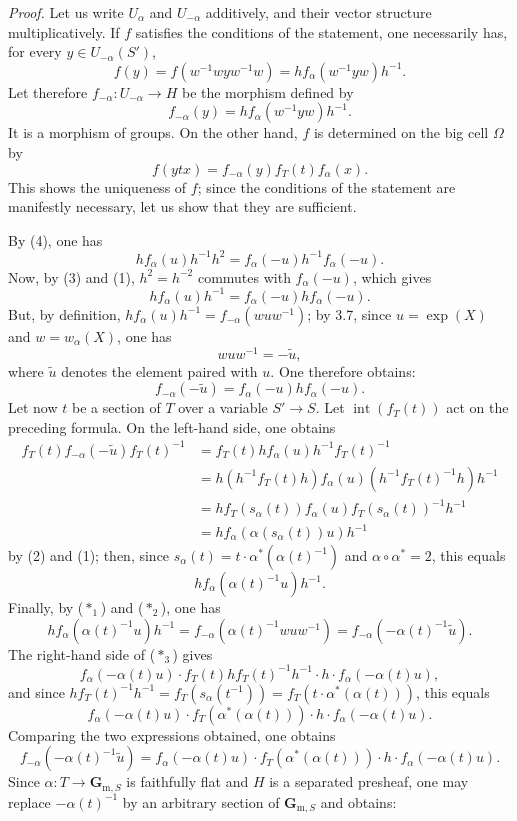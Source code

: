 \emph{Proof.} Let us write $U_\alpha$ and $U_{-\alpha}$ additively, and their vector structure multiplicatively. If $f$ satisfies the conditions of the statement, one necessarily has, for every $y\in U_{-\alpha}(S')$,
\[
f(y)=f(w^{-1}wyw^{-1}w)=hf_\alpha(w^{-1}yw)h^{-1}.
\]
Let therefore $f_{-\alpha}:U_{-\alpha}\to H$ be the morphism defined by
\begin{equation}\tag{$*_1$}\label{XX.6.eq.star1}
f_{-\alpha}(y)=hf_\alpha(w^{-1}yw)h^{-1}.
\end{equation}
It is a morphism of groups. On the other hand, $f$ is determined on the big cell $\Omega$ by
\[
f(ytx)=f_{-\alpha}(y)f_T(t)f_\alpha(x).
\]
This shows the uniqueness of $f$; since the conditions of the statement are manifestly necessary, let us show that they are sufficient.

By (4), one has
\[
hf_\alpha(u)h^{-1}h^2=f_\alpha(-u)h^{-1}f_\alpha(-u).
\]
Now, by (3) and (1), $h^2=h^{-2}$ commutes with $f_\alpha(-u)$, which gives
\[
hf_\alpha(u)h^{-1}=f_\alpha(-u)hf_\alpha(-u).
\]
But, by definition, $hf_\alpha(u)h^{-1}=f_{-\alpha}(wuw^{-1})$; by 3.7, since $u=\exp(X)$ and $w=w_\alpha(X)$, one has
\begin{equation}\tag{$*_2$}\label{XX.6.eq.star2}
wuw^{-1}=-\widetilde u,
\end{equation}
where $\widetilde u$ denotes the element paired with $u$. One therefore obtains:
\begin{equation}\tag{$*_3$}\label{XX.6.eq.star3}
f_{-\alpha}(-\widetilde u)=f_\alpha(-u)hf_\alpha(-u).
\end{equation}
Let now $t$ be a section of $T$ over a variable $S'\to S$. Let $\operatorname{int}(f_T(t))$ act on the preceding formula. On the left-hand side, one obtains{\renewcommand{\thefootnote}{(37)}}
\[
\begin{aligned}
f_T(t)f_{-\alpha}(-\widetilde u)f_T(t)^{-1}&=f_T(t)hf_\alpha(u)h^{-1}f_T(t)^{-1}\\
&=h(h^{-1}f_T(t)h)f_\alpha(u)(h^{-1}f_T(t)^{-1}h)h^{-1}\\
&=hf_T(s_\alpha(t))f_\alpha(u)f_T(s_\alpha(t))^{-1}h^{-1}\\
&=hf_\alpha(\alpha(s_\alpha(t))u)h^{-1}
\end{aligned}
\]
by (2) and (1); then, since $s_\alpha(t)=t\cdot\alpha^*(\alpha(t)^{-1})$ and $\alpha\circ\alpha^*=2$, this equals
\[
hf_\alpha(\alpha(t)^{-1}u)h^{-1}.
\]
Finally, by ($*_1$) and ($*_2$), one has
\[
hf_\alpha(\alpha(t)^{-1}u)h^{-1}=f_{-\alpha}(\alpha(t)^{-1}wuw^{-1})=f_{-\alpha}(-\alpha(t)^{-1}\widetilde u).
\]
The right-hand side of ($*_3$) gives
\[
f_\alpha(-\alpha(t)u)\cdot f_T(t)hf_T(t)^{-1}h^{-1}\cdot h\cdot f_\alpha(-\alpha(t)u),
\]
and since $hf_T(t)^{-1}h^{-1}=f_T(s_\alpha(t^{-1}))=f_T(t\cdot\alpha^*(\alpha(t)))$, this equals
\[
f_\alpha(-\alpha(t)u)\cdot f_T(\alpha^*(\alpha(t)))\cdot h\cdot f_\alpha(-\alpha(t)u).
\]
Comparing the two expressions obtained, one obtains
\[
f_{-\alpha}(-\alpha(t)^{-1}\widetilde u)=f_\alpha(-\alpha(t)u)\cdot f_T(\alpha^*(\alpha(t)))\cdot h\cdot f_\alpha(-\alpha(t)u).
\]
Since $\alpha:T\to\mathbf G_{\mathrm m,S}$ is faithfully flat and $H$ is a separated presheaf, one may replace $-\alpha(t)^{-1}$ by an arbitrary section of $\mathbf G_{\mathrm m,S}$ and obtains:

